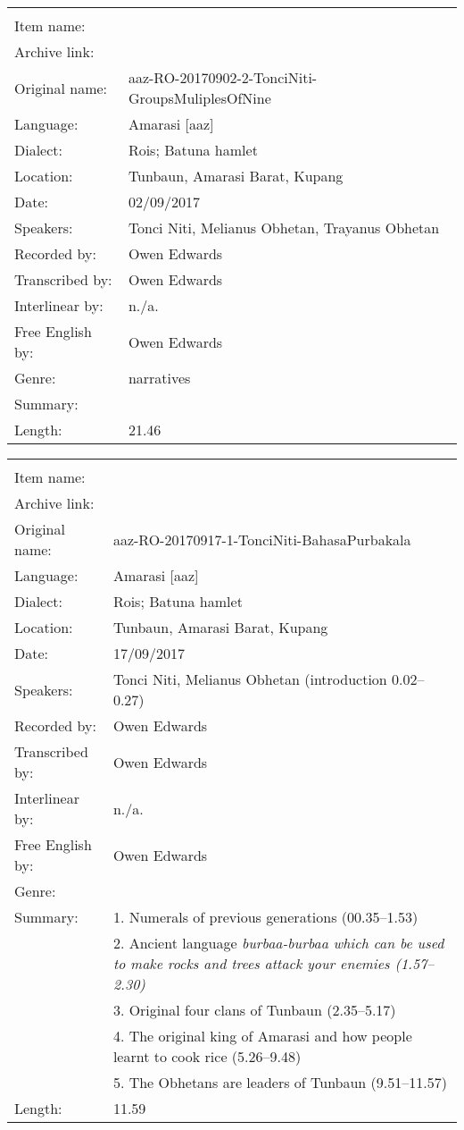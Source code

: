 \newpage
\noindent
\wg\begin{tabular}{lL{.67\textwidth}}
					& \\
Item name:			& \\
Archive link:		& \\
Original name:	& aaz-RO-20170902-2-TonciNiti-GroupsMuliplesOfNine\\
Language:				& Amarasi [aaz] \\
Dialect:				& Ro{\Q}is; Batuna hamlet \\
Location:				& Tunbaun, Amarasi Barat, Kupang \\
Date:						& 02/09/2017\\
Speakers:				& Tonci Niti, Melianus Obhetan, Trayanus Obhetan\\
Recorded by:		& Owen Edwards\\
Transcribed by:	& Owen Edwards\\
Interlinear by:	& n./a.\\
Free English by:& Owen Edwards\\
Genre:					& narratives\\
Summary:				& \\
Length:					& 21.46\\
\end{tabular}

\vspace{4mm}%
\noindent
\wg\begin{tabular}{lL{.67\textwidth}}
					& \\
Item name:			& \\
Archive link:		& \\
Original name:	& aaz-RO-20170917-1-TonciNiti-BahasaPurbakala\\
Language:				& Amarasi [aaz] \\
Dialect:				& Ro{\Q}is; Batuna hamlet \\
Location:				& Tunbaun, Amarasi Barat, Kupang \\
Date:						& 17/09/2017\\
Speakers:				& Tonci Niti, Melianus Obhetan (introduction 0.02--0.27)\\
Recorded by:		& Owen Edwards\\
Transcribed by:	& Owen Edwards\\
Interlinear by:	& n./a.\\
Free English by:& Owen Edwards\\
Genre:					& \\
Summary:				& 1. Numerals of previous generations (00.35--1.53)\\
								& 2. Ancient language \it{burbaa{\Q}-burbaa{\Q}} which can be used to make rocks and trees attack your enemies (1.57--2.30)\\
								& 3. Original four clans of Tunbaun (2.35--5.17)\\
								& 4. The original king of Amarasi and how people learnt to cook rice (5.26--9.48)\\
								& 5. The Obhetans are leaders of Tunbaun (9.51--11.57)\\
Length:					& 11.59\\
\end{tabular}


